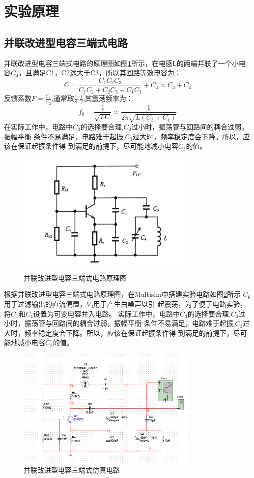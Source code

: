 \documentclass[UTF8]{ctexart}
\begin{document}
\section{实验原理}
\subsection{并联改进型电容三端式电路}
并联改进型电容三端式电路的原理图如图\ref{img:1}所示，在电感L的两端并联了一个小电容$C_4$，且满足C1，C2远大于C3，所以其回路等效电容为：
$$
C=\frac{C_1C_2C_3}{C_1C_2+C_2C_3+C_1C_3}+C_4\approx C_3+C_4
$$
反馈系数$F=\frac{C_1}{C_2}$,通常取$\frac{1}{8}$-$\frac{1}{2}$,其震荡频率为：
$$
f_0=\frac{1}{\sqrt{LC}}\approx \frac{1}{2\pi\sqrt{L(C_3+C_4)}}
$$
在实际工作中，电路中$C_3$的选择要合理,$C_3$过小时，振荡管与回路间的耦合过弱，振幅平衡
条件不易满足，电路难于起振,$C_3$过大时，频率稳定度会下降。所以，应该在保证起振条件得
到满足的前提下，尽可能地减小电容$C_3$的值。
\begin{figure}[htbp]
    \centering
    \includegraphics[width=0.8\textwidth]{1.png}
    \caption{并联改进型电容三端式电路原理图}
    \label{img:1}
\end{figure}
根据并联改进型电容三端式电路原理图，在Multisim中搭建实验电路如图\ref{img:2}所示
$C_6$用于过滤输出的直流偏置，$V_2$用于产生白噪声以引
起震荡，为了便于电路实验，将$C_1$和$C_4$设置为可变电容并入电路。
实际工作中，电路中$C_3$的选择要合理,$C_3$过小时，振荡管与回路间的耦合过弱，振幅平衡
条件不易满足，电路难于起振,$C_3$过大时，频率稳定度会下降。所以，应该在保证起振条件得
到满足的前提下，尽可能地减小电容$C_3$的值。
\begin{figure}[htbp]
    \centering
    \includegraphics[width=0.8\textwidth]{2.png}
    \caption{并联改进型电容三端式仿真电路}
    \label{img:2}
\end{figure}
\end{document}
